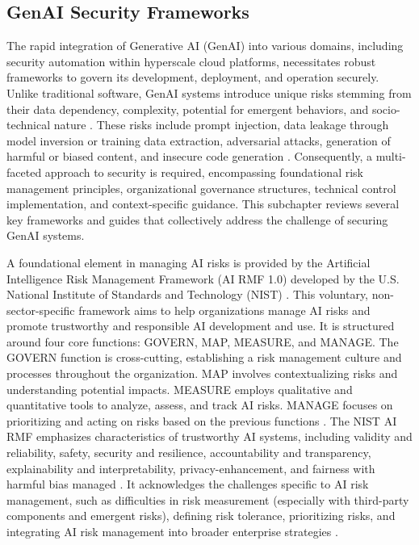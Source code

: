 
\subsection{GenAI Security Frameworks}
\label{sec:GenAI Security Frameworks}

The rapid integration of Generative AI (GenAI) into various domains, including security automation within hyperscale cloud platforms, necessitates robust frameworks to govern its development, deployment, and operation securely. Unlike traditional software, GenAI systems introduce unique risks stemming from their data dependency, complexity, potential for emergent behaviors, and socio-technical nature \cite{tabassi_artificial_2023}. These risks include prompt injection, data leakage through model inversion or training data extraction, adversarial attacks, generation of harmful or biased content, and insecure code generation \cite{haryanto_secgenai_2024, hansen_introducing_2023}. Consequently, a multi-faceted approach to security is required, encompassing foundational risk management principles, organizational governance structures, technical control implementation, and context-specific guidance. This subchapter reviews several key frameworks and guides that collectively address the challenge of securing GenAI systems.

A foundational element in managing AI risks is provided by the Artificial Intelligence Risk Management Framework (AI RMF 1.0) developed by the U.S. National Institute of Standards and Technology (NIST) \cite{tabassi_artificial_2023}. This voluntary, non-sector-specific framework aims to help organizations manage AI risks and promote trustworthy and responsible AI development and use. It is structured around four core functions: GOVERN, MAP, MEASURE, and MANAGE. The GOVERN function is cross-cutting, establishing a risk management culture and processes throughout the organization. MAP involves contextualizing risks and understanding potential impacts. MEASURE employs qualitative and quantitative tools to analyze, assess, and track AI risks. MANAGE focuses on prioritizing and acting on risks based on the previous functions \cite{tabassi_artificial_2023}. The NIST AI RMF emphasizes characteristics of trustworthy AI systems, including validity and reliability, safety, security and resilience, accountability and transparency, explainability and interpretability, privacy-enhancement, and fairness with harmful bias managed \cite{tabassi_artificial_2023}. It acknowledges the challenges specific to AI risk management, such as difficulties in risk measurement (especially with third-party components and emergent risks), defining risk tolerance, prioritizing risks, and integrating AI risk management into broader enterprise strategies \cite{tabassi_artificial_2023}.

